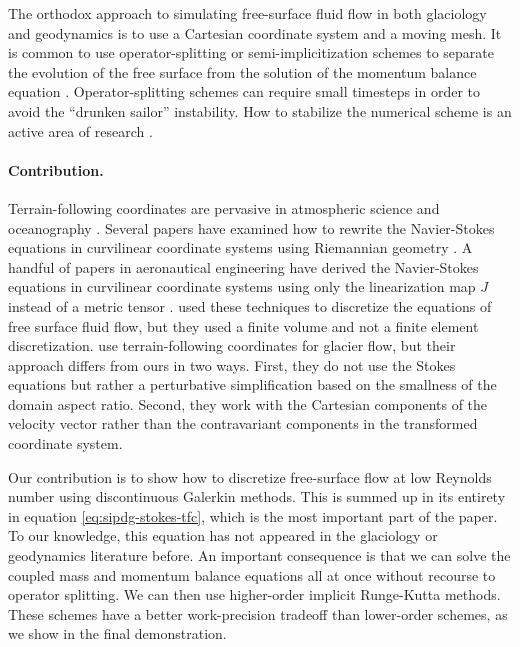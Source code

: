 \documentclass[gmd, manuscript]{copernicus}
\begin{document}
The orthodox approach to simulating free-surface fluid flow in both glaciology and geodynamics is to use a Cartesian coordinate system and a moving mesh.
It is common to use operator-splitting or semi-implicitization schemes to separate the evolution of the free surface from the solution of the momentum balance equation \citep{gagliardini2013capabilities, rose2017stability}.
Operator-splitting schemes can require small timesteps in order to avoid the ``drunken sailor'' instability.
How to stabilize the numerical scheme is an active area of research \citep{ahlkrona2026fully}.

\paragraph{Contribution.}
Terrain-following coordinates are pervasive in atmospheric science and oceanography \citep{gal1975use}.
Several papers have examined how to rewrite the Navier-Stokes equations in curvilinear coordinate systems using Riemannian geometry \citep{luo2004contravariant}.
A handful of papers in aeronautical engineering have derived the Navier-Stokes equations in curvilinear coordinate systems using only the linearization map $J$ instead of a metric tensor \citep{warsi1981conservation, yang1994general}.
\citet{cannata2019numerical} used these techniques to discretize the equations of free surface fluid flow, but they used a finite volume and not a finite element discretization.
\citet{greve2009dynamics} use terrain-following coordinates for glacier flow, but their approach differs from ours in two ways.
First, they do not use the Stokes equations but rather a perturbative simplification based on the smallness of the domain aspect ratio.
Second, they work with the Cartesian components of the velocity vector rather than the contravariant components in the transformed coordinate system.

Our contribution is to show how to discretize free-surface flow at low Reynolds number using discontinuous Galerkin methods.
This is summed up in its entirety in equation \eqref{eq:sipdg-stokes-tfc}, which is the most important part of the paper.
To our knowledge, this equation has not appeared in the glaciology or geodynamics literature before.
An important consequence is that we can solve the coupled mass and momentum balance equations all at once without recourse to operator splitting.
We can then use higher-order implicit Runge-Kutta methods.
These schemes have a better work-precision tradeoff than lower-order schemes, as we show in the final demonstration.
\end{document}
